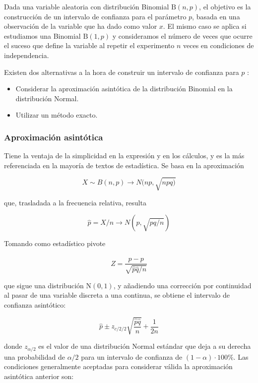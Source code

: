 \documentclass[
]{article}
\providecommand{\tightlist}{%
  \setlength{\itemsep}{0pt}\setlength{\parskip}{0pt}}
\begin{document}
Dada una variable aleatoria con distribución Binomial \(\mathrm{B}(n, p)\), el objetivo es la construcción de un intervalo de confianza para el parámetro \(p\), basada en una observación de la variable que ha dado como valor \(x\). El mismo caso se aplica si estudiamos una Binomial \(\mathrm{B}(1, p)\) y consideramos el número de veces que ocurre el suceso que define la variable al repetir el experimento \(n\) veces en condiciones de independencia.

Existen dos alternativas a la hora de construir un intervalo de confianza para \(p\) :

\begin{itemize}
\tightlist
\item
  Considerar la aproximación asintótica de la distribución Binomial en la distribución Normal.
\item
  Utilizar un método exacto.
\end{itemize}

\subsubsection{Aproximación asintótica}\label{aproximaciuxf3n-asintuxf3tica}

Tiene la ventaja de la simplicidad en la expresión y en los cálculos, y es la más referenciada en la mayoría de textos de estadística. Se basa en la aproximación

\[
X \sim B(n, p) \rightarrow N(n p, \sqrt{n p q)}
\]

que, trasladada a la frecuencia relativa, resulta

\[
\hat{p}=X / n \rightarrow N(p, \sqrt{p q / n})
\]

Tomando como estadístico pivote

\[
Z=\frac{\hat{p}-p}{\sqrt{\hat{p} \hat{q} / n}}
\]

que sigue una distribución \(\mathrm{N}(0,1)\), y añadiendo una corrección por continuidad al pasar de una variable discreta a una continua, se obtiene el intervalo de confianza asintótico:

\[
\hat{p} \pm z_{c / 2 / 2} \sqrt{\frac{\hat{p} \hat{q}}{n}}+\frac{1}{2 n}
\]

donde \(z_{\alpha / 2}\) es el valor de una distribución Normal estándar que deja a su derecha una probabilidad de \(\alpha / 2\) para un intervalo de confianza de \((1-\alpha) \cdot 100 \%\). Las condiciones generalmente aceptadas para considerar válida la aproximación asintótica anterior son:
\end{document}

